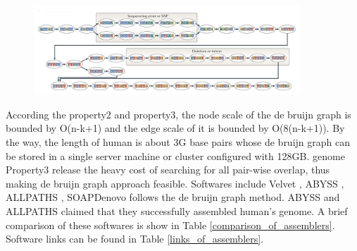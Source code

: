 \documentclass{article}
\begin{document}
\begin{figure}[ht]
  \centering
  \includegraphics[width=10cm]{Figure6.jpg}\\
  \caption{}\label{debruijn_graph_example}
\end{figure}
According the property2 and property3, the node scale of the de bruijn graph is bounded by O(n-k+1) and the edge scale of it is bounded by O(8(n-k+1)). By the way, the length of human is about 3G base pairs whose de bruijn graph can be stored in a single server machine or cluster configured with 128GB. genome Property3 release the heavy cost of searching for all pair-wise overlap, thus making de bruijn graph approach feasible. Softwares include Velvet \cite{zerbino2008velvet}, ABYSS \cite{simpson2009abyss}, ALLPATHS \cite{butler2008allpaths}, SOAPDenovo \cite{li2010novo} follows the de bruijn graph method. ABYSS and ALLPATHS claimed that they successfully assembled human's genome. A brief comparison of these softwares is show in Table \ref{comparison_of_assemblers}. Software links can be found in Table \ref{links_of_assemblers}.\\
\end{document}
